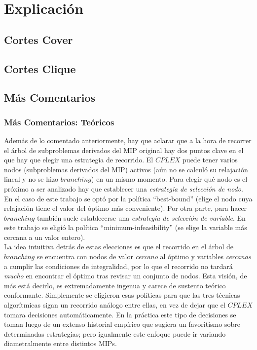 \section{Explicación}

\subsection{Cortes Cover}

\newpage

\newpage

\subsection{Cortes Clique}

\newpage

\newpage

\subsection{Más Comentarios}
\subsubsection{Más Comentarios: Teóricos}
Además de lo comentado anteriormente, hay que aclarar que a la hora de recorrer el árbol de subproblemas derivados del MIP original hay dos puntos clave en el que hay que elegir una estrategia de recorrido. El $CPLEX$ puede tener varios nodos (subproblemas derivados del MIP) activos (aún no se calculó su relajación lineal y no se hizo $branching$) en un mismo momento. Para elegir qué nodo es el próximo a ser analizado hay que establecer una \emph{estrategia de selección de nodo}. En el caso de este trabajo se optó por la política ``best-bound'' (elige el nodo cuya relajación tiene el valor del óptimo más conveniente). Por otra parte, para hacer $branching$ también suele establecerse una \emph{estrategia de selección de variable}. En este trabajo se eligió la política ``minimum-infeasibility'' (se elige la variable más cercana a un valor entero).\\

La idea intuitiva detrás de estas elecciones es que el recorrido en el árbol de $branching$ se encuentra con nodos de valor \emph{cercano} al óptimo y variables \emph{cercanas} a cumplir las condiciones de integralidad, por lo que el recorrido no tardará \emph{mucho} en encontrar el óptimo tras revisar un conjunto de nodos. Esta visión, de más está decirlo, es extremadamente ingenua y carece de sustento teórico conformante. Simplemente se eligieron esas políticas para que las tres técnicas algorítmicas sigan un recorrido análogo entre ellas, en vez de dejar que el $CPLEX$ tomara decisiones automáticamente. En la práctica este tipo de decisiones se toman luego de un extenso historial empírico que sugiera un favoritismo sobre determinadas estrategias; pero igualmente este enfoque puede ir variando diametralmente entre distintos MIPs.

